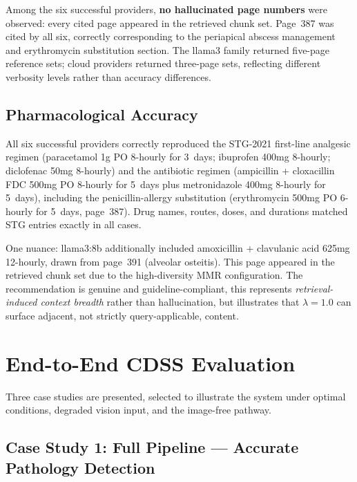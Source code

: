 \documentclass[12pt,a4paper]{report}
\begin{document}
	Among the six successful providers, \textbf{no hallucinated page numbers}
	were observed: every cited page appeared in the retrieved chunk set.
	Page~387 was cited by all six, correctly corresponding to the periapical
	abscess management and erythromycin substitution section. The llama3 family
	returned five-page reference sets; cloud providers returned three-page sets,
	reflecting different verbosity levels rather than accuracy differences.
	
	\subsection{Pharmacological Accuracy}
	
	All six successful providers correctly reproduced the STG-2021 first-line
	analgesic regimen (paracetamol 1g PO 8-hourly for 3~days; ibuprofen 400mg
	8-hourly; diclofenac 50mg 8-hourly) and the antibiotic regimen (ampicillin +
	cloxacillin FDC 500mg PO 8-hourly for 5~days plus metronidazole 400mg 8-hourly
	for 5~days), including the penicillin-allergy substitution (erythromycin 500mg
	PO 6-hourly for 5~days, page~387). Drug names, routes, doses, and durations
	matched STG entries exactly in all cases.
	
	One nuance: llama3:8b additionally included amoxicillin + clavulanic acid 625mg
	12-hourly, drawn from page~391 (alveolar osteitis). This page appeared in the
	retrieved chunk set due to the high-diversity MMR configuration. The recommendation
	is genuine and guideline-compliant, this represents \emph{retrieval-induced
		context breadth} rather than hallucination, but illustrates that $\lambda{=}1.0$
	can surface adjacent, not strictly query-applicable, content.
	
	\section{End-to-End CDSS Evaluation}
	\label{sec:results_cdss}
	
	Three case studies are presented, selected to illustrate the system under
	optimal conditions, degraded vision input, and the image-free pathway.
	
	\subsection{Case Study 1: Full Pipeline --- Accurate Pathology Detection}
	\label{subsec:case1}
	
\end{document}
